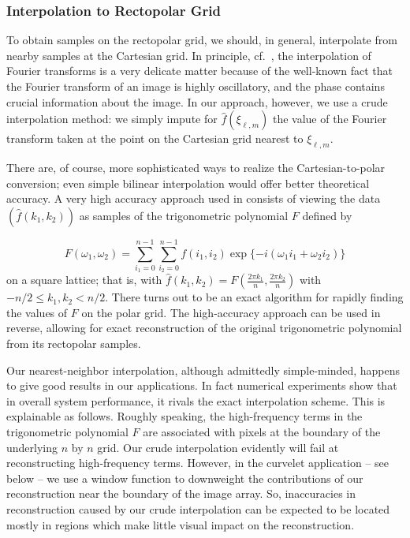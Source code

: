 \subsubsection{Interpolation to Rectopolar Grid}

To obtain samples on the rectopolar grid,
we should, in general, interpolate from
nearby samples at the Cartesian grid.
In principle, cf.\
\cite{cur:averbuch01,cur:donoho_02}, 
the interpolation of Fourier transforms is a
very delicate matter because of the well-known fact that
the Fourier transform of an image is highly oscillatory,
and the phase contains crucial information about the image.
In our approach, however, we use a crude interpolation method:
we simply impute for
$\hat{f}(\xi_{\ell,m})$ the value of the Fourier transform taken at
the point on the Cartesian grid nearest to
$\xi_{\ell,m}$.

There are, of course, more sophisticated ways to realize the
Cartesian-to-polar conversion; even simple bilinear interpolation
would offer better theoretical accuracy. A very high accuracy
approach used in \cite{FRT} consists of viewing the data
$(\hat{f}(k_1,k_2))$ as
samples of the trigonometric polynomial $F$ defined by

\begin{equation}
\label{eq:2d-poly}
F(\omega_1,\omega_2) = \sum_{i_1 = 0}^{n-1}  \sum_{i_2 =0}^{n-1}
    f(i_1,i_2) \exp\{-i(\omega_1 i_1 + \omega_2 i_2)\}
\end{equation}
on a square lattice; that is, with $\hat{f}(k_1,k_2) = F(\frac{2\pi
      k_1}{n},\frac{2\pi k_2}{n})$ with $ -n/2 \le k_1, k_2 < n/2$.
There turns out \cite{FRT,cur:averbuch01} to be an exact algorithm for
rapidly
finding the values of $F$ on the polar grid. The high-accuracy
approach can be used in reverse, allowing for exact reconstruction
of the original trigonometric polynomial from its rectopolar samples.

Our nearest-neighbor interpolation, although admittedly simple-minded,
happens to give  good results in our applications.
In fact numerical experiments show that in overall system
performance, it rivals the exact interpolation scheme.
This is explainable as follows.  Roughly speaking, the high-frequency
terms in the
trigonometric polynomial $F$ are associated with pixels at the boundary of
the underlying $n$ by $n$ grid.  Our crude interpolation evidently will
fail at reconstructing high-frequency terms. However, in the curvelet
application -- see below -- we use a window function to downweight
the contributions of our reconstruction near the boundary of the image
array.
So, inaccuracies in
reconstruction caused by our crude interpolation can be expected to
be located mostly in regions which make little visual
impact on the reconstruction.

